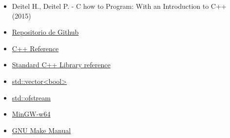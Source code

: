 \documentclass[12pt]{article}
\begin{document}
\begin{itemize}
    \item Deitel H., Deitel P. - C how to Program: With an Introduction to C++
        (2015)
    \item
        \href{https://github.com/mjkloeckner/CB100}{Repositorio de Github}
    \item
        \href{https://en.cppreference.com/w/}{C++ Reference}
    \item
        \href{https://cplusplus.com/reference/}{Standard C++ Library reference}
    \item
        \href{https://en.cppreference.com/w/cpp/container/vector_bool}{
            std::vector\textless bool\textgreater}
    \item
        \href{https://cplusplus.com/reference/fstream/ofstream/}{std::ofstream}
    \item
        \href{https://www.mingw-w64.org/}{MinGW-w64}
    \item
        \href{https://www.gnu.org/software/make/manual/html_node/index.html}{GNU
        Make Manual}
\end{itemize}
\end{document}
